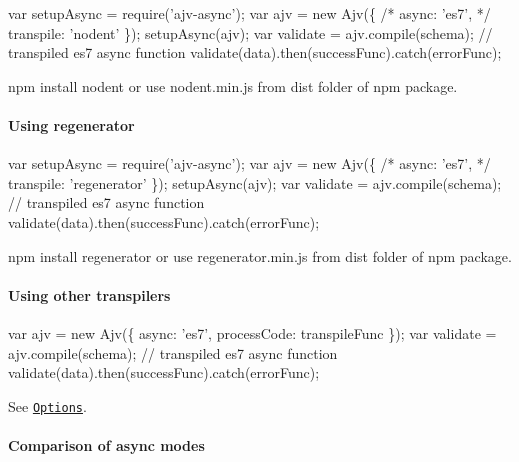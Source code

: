 \begin{DoxyCode}
var setupAsync = require('ajv-async');
var ajv = new Ajv(\{ /* async: 'es7', */ transpile: 'nodent' \});
setupAsync(ajv);
var validate = ajv.compile(schema); // transpiled es7 async function
validate(data).then(successFunc).catch(errorFunc);
\end{DoxyCode}


{\ttfamily npm install nodent} or use {\ttfamily nodent.\+min.\+js} from dist folder of npm package.

\paragraph*{Using regenerator}


\begin{DoxyCode}
var setupAsync = require('ajv-async');
var ajv = new Ajv(\{ /* async: 'es7', */ transpile: 'regenerator' \});
setupAsync(ajv);
var validate = ajv.compile(schema); // transpiled es7 async function
validate(data).then(successFunc).catch(errorFunc);
\end{DoxyCode}


{\ttfamily npm install regenerator} or use {\ttfamily regenerator.\+min.\+js} from dist folder of npm package.

\paragraph*{Using other transpilers}


\begin{DoxyCode}
var ajv = new Ajv(\{ async: 'es7', processCode: transpileFunc \});
var validate = ajv.compile(schema); // transpiled es7 async function
validate(data).then(successFunc).catch(errorFunc);
\end{DoxyCode}


See \href{#options}{\tt Options}.

\paragraph*{Comparison of async modes}

